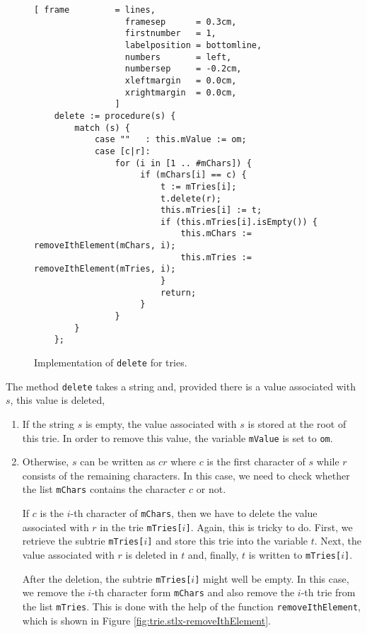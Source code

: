 \begin{figure}[!ht]
\centering
\begin{Verbatim}[ frame         = lines, 
                  framesep      = 0.3cm, 
                  firstnumber   = 1,
                  labelposition = bottomline,
                  numbers       = left,
                  numbersep     = -0.2cm,
                  xleftmargin   = 0.0cm,
                  xrightmargin  = 0.0cm,
                ]
    delete := procedure(s) {
        match (s) {
            case ""   : this.mValue := om;
            case [c|r]: 
                for (i in [1 .. #mChars]) {
                     if (mChars[i] == c) {
                         t := mTries[i]; 
                         t.delete(r);
                         this.mTries[i] := t;
                         if (this.mTries[i].isEmpty()) {
                             this.mChars := removeIthElement(mChars, i);
                             this.mTries := removeIthElement(mTries, i);
                         }
                         return;
                     }
                }
        }
    };
\end{Verbatim}
\vspace*{-0.3cm}
\caption{Implementation of \texttt{delete} for tries.}
\label{fig:trie.stlx-delete}
\end{figure}

The method \texttt{delete} takes a string and, provided there is a value associated with $s$, this
value is deleted,
\begin{enumerate}
\item If the string $s$ is empty, the value associated with $s$ is stored at the root of this trie.
      In order to remove this value, the variable \texttt{mValue} is set to \texttt{om}.
\item Otherwise, $s$ can be written as $cr$ where $c$ is the first character of $s$ while $r$
      consists of the remaining characters.  In this case, we need to check whether the list
      \texttt{mChars} contains the character $c$ or not.
 
      If $c$ is the $i$-th character of \texttt{mChars}, then we have to delete the value 
      associated with $r$ in the trie \texttt{mTries[$i$]}.  Again, this is tricky to do.
      First, we retrieve the subtrie \texttt{mTries[$i$]} and store this trie into the
      variable $t$.  Next, the value associated with $r$ is deleted in $t$ and, finally, 
      $t$ is written to \texttt{mTries[$i$]}.  

      After the deletion, the subtrie  \texttt{mTries[$i$]} might well be empty.  In this case,
      we remove the $i$-th character form \texttt{mChars} and also remove the $i$-th trie from the list
      \texttt{mTries}.  This is done with the help of the function \texttt{removeIthElement},
      which is shown in Figure \ref{fig:trie.stlx-removeIthElement}.
\end{enumerate}

